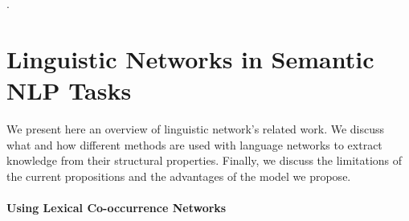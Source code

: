 .

\section{Linguistic Networks in Semantic NLP Tasks}



We present here an overview of linguistic network's related work. We discuss what and how different methods are used with language networks to extract knowledge from their structural properties. Finally, we discuss the limitations of the current propositions and the advantages of the model we propose.



\paragraph{Using Lexical Co-occurrence Networks}

